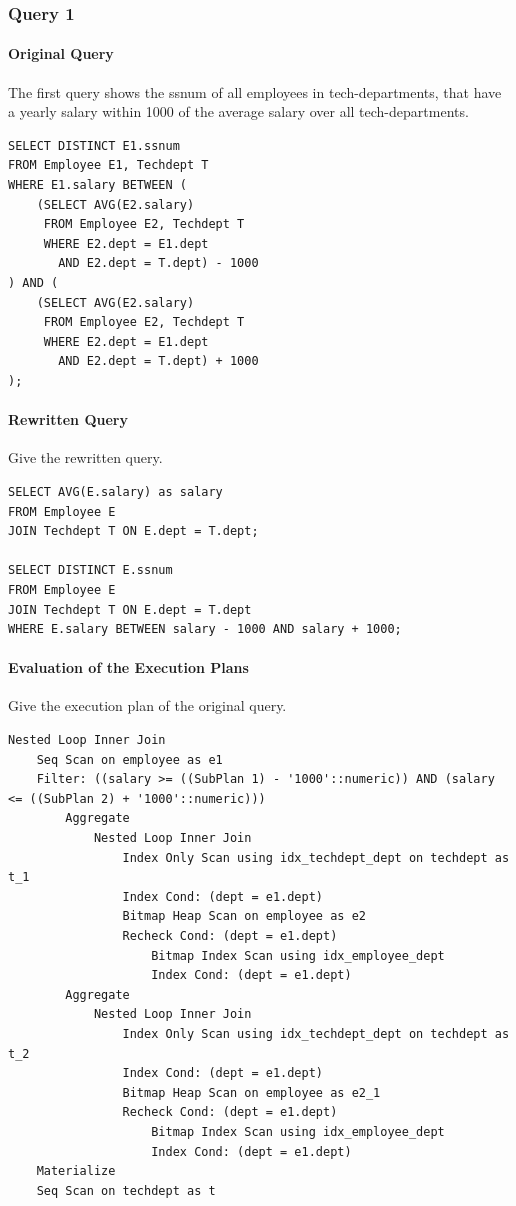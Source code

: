 \documentclass[11pt]{scrartcl}
\begin{document}
\subsubsection*{Query 1}

\paragraph{Original Query}

The first query shows the ssnum of all employees in tech-departments, that have a yearly salary within 1000 of the average salary over all tech-departments.

\begin{lstlisting}[style=dbtsql]
SELECT DISTINCT E1.ssnum
FROM Employee E1, Techdept T
WHERE E1.salary BETWEEN (
    (SELECT AVG(E2.salary)
     FROM Employee E2, Techdept T
     WHERE E2.dept = E1.dept
       AND E2.dept = T.dept) - 1000
) AND (
    (SELECT AVG(E2.salary)
     FROM Employee E2, Techdept T
     WHERE E2.dept = E1.dept
       AND E2.dept = T.dept) + 1000
);
\end{lstlisting}

\paragraph{Rewritten Query}

Give the rewritten query.

\begin{lstlisting}[style=dbtsql]
SELECT AVG(E.salary) as salary
FROM Employee E
JOIN Techdept T ON E.dept = T.dept;

SELECT DISTINCT E.ssnum
FROM Employee E
JOIN Techdept T ON E.dept = T.dept
WHERE E.salary BETWEEN salary - 1000 AND salary + 1000;
\end{lstlisting}

\paragraph{Evaluation of the Execution Plans}

Give the execution plan of the original query.

{\small
\parskip0pt\begin{verbatim}
Nested Loop Inner Join
	Seq Scan on employee as e1
	Filter: ((salary >= ((SubPlan 1) - '1000'::numeric)) AND (salary <= ((SubPlan 2) + '1000'::numeric)))
		Aggregate
			Nested Loop Inner Join
				Index Only Scan using idx_techdept_dept on techdept as t_1
				Index Cond: (dept = e1.dept)
				Bitmap Heap Scan on employee as e2
				Recheck Cond: (dept = e1.dept)
					Bitmap Index Scan using idx_employee_dept
					Index Cond: (dept = e1.dept)
		Aggregate
			Nested Loop Inner Join
				Index Only Scan using idx_techdept_dept on techdept as t_2
				Index Cond: (dept = e1.dept)
				Bitmap Heap Scan on employee as e2_1
				Recheck Cond: (dept = e1.dept)
					Bitmap Index Scan using idx_employee_dept
					Index Cond: (dept = e1.dept)
	Materialize
	Seq Scan on techdept as t
\end{verbatim}}
\end{document}
